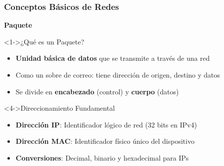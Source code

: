\documentclass[aspectratio=169]{beamer}
\begin{document}
      
      \begin{frame}
          \frametitle{Conceptos Básicos de Redes}
          \begin{center}
              \Large \textbf{Paquete}
              \end{center}
      \begin{block}<1->{¿Qué es un Paquete?}
      \begin{itemize}
      \item<1-> \textbf{Unidad básica de datos} que se transmite a través de una red
      \item<2-> Como un sobre de correo: tiene dirección de origen, destino y datos
      \item<3-> Se divide en \textbf{encabezado} (control) y \textbf{cuerpo} (datos)
      \end{itemize}
      \end{block}
      
      \begin{block}<4->{Direccionamiento Fundamental}
      \begin{itemize}
      \item<4-> \textbf{Dirección IP}: Identificador lógico de red (32 bits en IPv4)
      \item<5-> \textbf{Dirección MAC}: Identificador físico único del dispositivo
      \item<6-> \textbf{Conversiones}: Decimal, binario y hexadecimal para IPs
      \end{itemize}
      \end{block}
      \end{frame}
      
\end{document}
